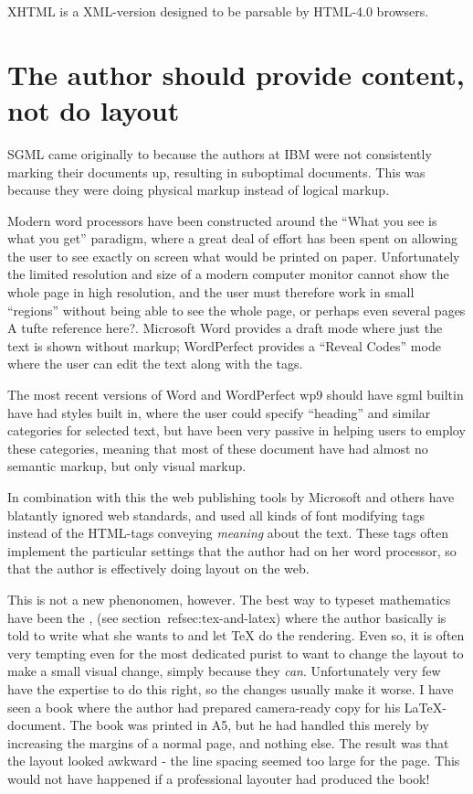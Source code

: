 XHTML is a XML-version designed to be parsable by HTML-4.0 browsers.


\section{The author should provide content, not do layout}

SGML came originally to because the authors at IBM were not
consistently marking their documents up, resulting in suboptimal
documents.  This was because they were doing physical markup instead
of logical markup.

Modern word processors have been constructed around the ``What you see
is what you get'' paradigm, where a great deal of effort has been
spent on allowing the user to see exactly on screen what would be
printed on paper.   Unfortunately the limited resolution and size of a modern
computer monitor cannot show the whole page in high resolution, and
the user must therefore work in small ``regions'' without being able
to see the whole page, or perhaps even several pages \textsf{A tufte
  reference here?}.  Microsoft Word provides a draft mode where just
the text is shown without markup;  WordPerfect provides a ``Reveal
Codes'' mode where the user can edit the text along with the tags.

The most recent versions of Word and WordPerfect \textsf{wp9 should
  have sgml builtin} have had styles built
in, where the user could specify ``heading'' and similar categories
for selected text, but have been very passive in helping users to
employ these categories, meaning that most of these
document have had almost no semantic markup, but only visual markup.

In combination with this the web publishing tools by Microsoft and
others have blatantly ignored web standards, and used all kinds of
font modifying tags instead of the HTML-tags conveying \textit{meaning}
about the text.  These tags often implement the particular settings
that the author had on her word processor, so that the author is
effectively doing layout on the web.

This is not a new phenonomen, however.  The best way to typeset
mathematics have been the , (see section~\textsf{ref{sec:tex-and-latex}}) where the
author basically is told to write what she wants to and let {TeX} do
the rendering.  Even so, it is often very tempting even for the most
dedicated purist to want to change the layout to make a small visual
change, simply because they \textit{can}.  Unfortunately very few have
the expertise to do this right, so the changes usually make it worse.
I have seen a book where the author had prepared camera-ready copy for
his {\LaTeX}-document.  The book was printed in A5, but he had handled
this merely by increasing the margins of a normal page, and nothing
else.  The result was that the layout looked awkward - the line
spacing seemed too large for the page.  This would not have happened
if a professional layouter had produced the book!

